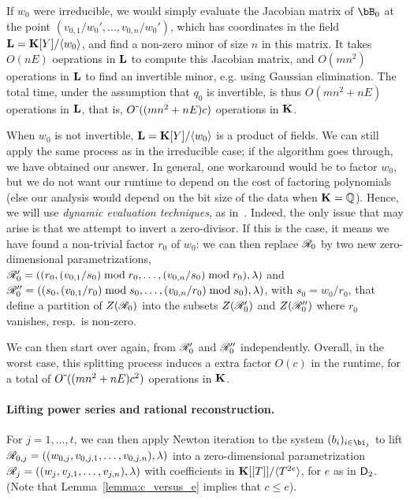 \documentclass[12pt]{article}
\begin{document}
If $w_0$ were irreducible, we would simply evaluate the Jacobian
matrix of $\bB_0$ at the point $(v_{0,1}/w_0',\dots,v_{0,n}/w_0')$,
which has coordinates in the field $\mathbf{L}=\mathbf{K}[Y]/\langle w_0 \rangle$,
and find a non-zero minor of size $n$ in this matrix. It takes
$O(n E)$ oeprations in $\mathbf{L}$ to compute this Jacobian matrix, and
$O(mn^2)$ operations in $\mathbf{L}$ to find an invertible minor, e.g. using
Gaussian elimination. The total time, under the assumption that $q_0$
is invertible, is thus $O(mn^2 + nE)$ operations in $\mathbf{L}$, that is,
${O}{\,\tilde{ }\,}( (mn^2 + nE) c)$ operations in $\mathbf{K}$.

When $w_0$ is not invertible, $\mathbf{L}=\mathbf{K}[Y]/\langle w_0 \rangle$ is a
product of fields. We can still apply the same process as in the
irreducible case; if the algorithm goes through, we have obtained our
answer. In general, one workaround would be to factor $w_0$, but we do
not want our runtime to depend on the cost of factoring polynomials
(else our analysis would depend on the bit size of the data when
$\mathbf{K}=\mathbb{Q}$). Hence, we will use {\em dynamic evaluation
  techniques}, as in~\cite{D5}. Indeed, the only issue that may arise
is that we attempt to invert a zero-divisor. If this is the case, it
means we have found a non-trivial factor $r_0$ of $w_0$: we can then
replace $\mathscr{R}_0$ by two new zero-dimensional parametrizations,
$\mathscr{R}'_0=((r_0,(v_{0,1}/s_0) \bmod r_0,\dots,(v_{0,n}/s_0)\bmod
r_0),\lambda)$
and
$\mathscr{R}''_0=((s_0,(v_{0,1}/r_0) \bmod s_0,\dots,(v_{0,n}/ r_0)\bmod
s_0),\lambda)$,
with $s_0=w_0/r_0$, that define a partition of $Z(\mathscr{R}_0)$ into the
subsets $Z(\mathscr{R}'_0)$ and $Z(\mathscr{R}''_0)$ where $r_0$ vanishes, resp.\
is non-zero.

We can then start over again, from $\mathscr{R}'_0$ and $\mathscr{R}''_0$
independently. Overall, in the worst case, this splitting process 
induces a extra factor $O(c)$ in the runtime, 
for a total of ${O}{\,\tilde{ }\,}( (mn^2 + nE) c^2)$ operations in $\mathbf{K}$.

\paragraph{Lifting power series and rational reconstruction.}
For $j=1,\dots,t$, we can then apply Newton iteration to the system
$(b_i)_{i \in \bi_j}$ to lift
$\mathscr{R}_{0,j}=((w_{0,j},v_{0,j,1},\dots,v_{0,j,n}),\lambda)$ into a
zero-dimensional parametrization
$\mathscr{R}_{j}=((w_{j},v_{j,1},\dots,v_{j,n}),\lambda)$ with coefficients
in $\mathbf{K}[[T]]/\langle T^{2e}\rangle$, for $e$ as in ${\mathsf{D}}_2$.  (Note
that Lemma~\ref{lemma:c_versus_e} implies that $c \le e$).
\end{document}
